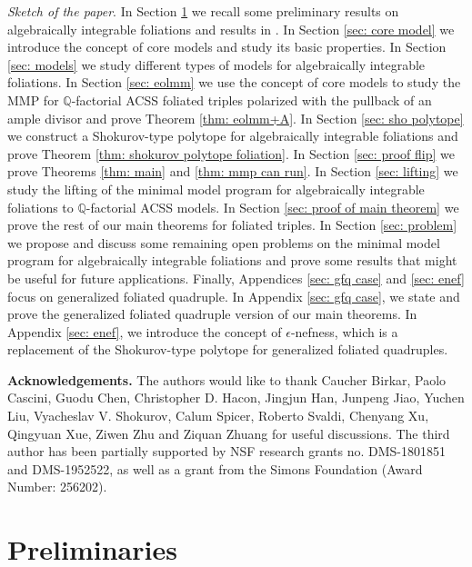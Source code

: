 \documentclass[11pt]{amsart}
\numberwithin{equation}{section}
\newcommand{\Qq}{\mathbb{Q}}
\theoremstyle{definition}
\theoremstyle{definition}
\theoremstyle{definition}
\begin{document}
\noindent\textit{Sketch of the paper}. In Section \ref{sec: preliminaries} we recall some preliminary results on algebraically integrable foliations and results in \cite{CHLX23}. In Section \ref{sec: core model} we introduce the concept of core models and study its basic properties. In Section \ref{sec: models} we study different types of models for algebraically integrable foliations. In Section \ref{sec: eolmm} we use the concept of core models to study the MMP for $\Qq$-factorial ACSS foliated triples polarized with the pullback of an ample divisor and prove Theorem \ref{thm: eolmm+A}. In Section \ref{sec: sho polytope} we construct a Shokurov-type polytope for algebraically integrable foliations and prove Theorem \ref{thm: shokurov polytope foliation}. In Section \ref{sec: proof flip} we prove Theorems \ref{thm: main} and \ref{thm: mmp can run}.  In Section \ref{sec: lifting} we study the lifting of the minimal model program for algebraically integrable foliations to $\Qq$-factorial ACSS models. In Section \ref{sec: proof of main theorem} we prove the rest of our main theorems for foliated triples. In Section \ref{sec: problem} we propose and discuss some remaining open problems on the minimal model program for algebraically integrable foliations and prove some results that might be useful for future applications. Finally, Appendices \ref{sec: gfq case} and \ref{sec: enef} focus on generalized foliated quadruple. In Appendix \ref{sec: gfq case}, we state and prove the generalized foliated quadruple version of our main theorems. In Appendix \ref{sec: enef}, we introduce the concept of $\epsilon$-nefness, which is a replacement of the Shokurov-type polytope for generalized foliated quadruples.

\medskip

\noindent\textbf{Acknowledgements.} The authors would like to thank Caucher Birkar, Paolo Cascini, Guodu Chen, Christopher D. Hacon, Jingjun Han, Junpeng Jiao, Yuchen Liu, Vyacheslav V. Shokurov, Calum Spicer, Roberto Svaldi, Chenyang Xu, Qingyuan Xue, Ziwen Zhu and Ziquan Zhuang for useful discussions. The third author has been partially supported by NSF research grants no. DMS-1801851 and DMS-1952522, as well as a grant from the Simons Foundation (Award Number: 256202).







\section{Preliminaries}\label{sec: preliminaries} 
\end{document}
